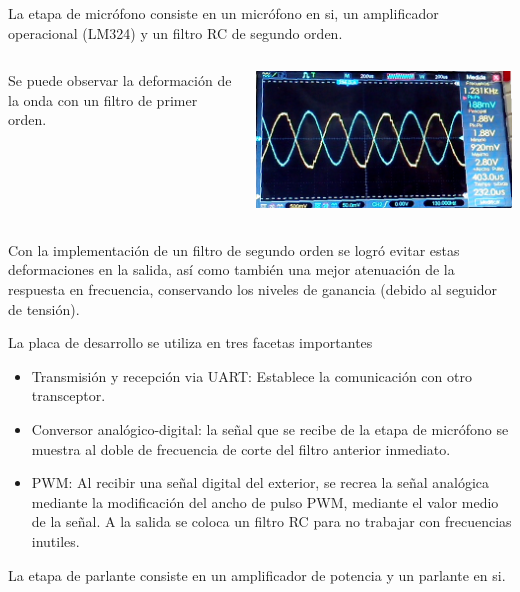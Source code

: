 \begin{frame}
La etapa de micrófono consiste en un micrófono en si, un amplificador operacional (LM324) y un filtro RC de segundo orden.


\begin{columns}
    \begin{column}{0.5\textwidth}

     Se puede observar la deformación de la onda con un filtro de primer orden.

    \end{column}
    \begin{column}{0.5\textwidth}
      \includegraphics[width=.8\linewidth]{rcprimerorden}
    \end{column}
  \end{columns}

Con la implementación de un filtro de segundo orden se logró evitar estas deformaciones en la salida, así como también una mejor atenuación de la respuesta en frecuencia, conservando los niveles de ganancia (debido al seguidor de tensión).
\end{frame}


\begin{frame}

La placa de desarrollo se utiliza en tres facetas importantes
\begin{itemize}

\item Transmisión y recepción via UART: Establece la comunicación con otro transceptor.

\item Conversor analógico-digital: la señal que se recibe de la etapa de micrófono se muestra al doble de frecuencia de corte del filtro anterior inmediato.

\item PWM: Al recibir una señal digital del exterior, se recrea la señal analógica mediante la modificación del ancho de pulso PWM, mediante el valor medio de la señal. A la salida se coloca un filtro RC para no trabajar con frecuencias inutiles.


\end{itemize}

La etapa de parlante consiste en un amplificador de potencia y un parlante en si.

\end{frame}